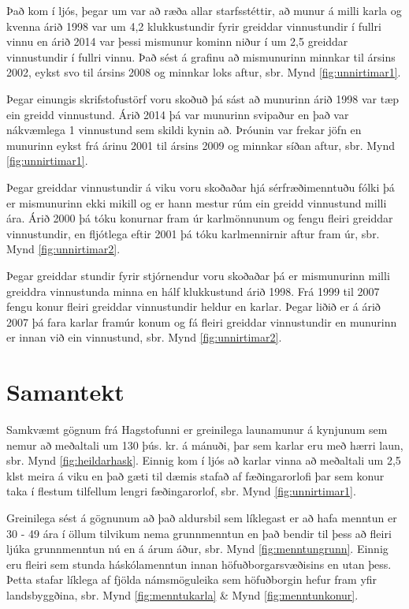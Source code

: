 \documentclass[12pt, git, draft]{rureport}
\begin{document}
Það kom í ljós, þegar um var að ræða allar starfsstéttir, að munur á milli karla og kvenna árið 1998 var um 4,2 klukkustundir fyrir greiddar vinnustundir í fullri vinnu en árið 2014 var þessi mismunur kominn niður í um 2,5 greiddar vinnustundir í fullri vinnu.
Það sést á grafinu að mismunurinn minnkar til ársins 2002, eykst svo til ársins 2008 og minnkar loks aftur, sbr. Mynd \ref{fig:unnirtimar1}.

Þegar einungis skrifstofustörf voru skoðuð þá sást að munurinn árið 1998 var tæp ein greidd vinnustund. Árið 2014 þá var munurinn svipaður en það var nákvæmlega 1 vinnustund sem skildi kynin að.
Þróunin var frekar jöfn en munurinn eykst frá árinu 2001  til ársins 2009 og minnkar síðan aftur, sbr. Mynd \ref{fig:unnirtimar1}.

Þegar greiddar vinnustundir á viku voru skoðaðar hjá sérfræðimenntuðu fólki þá er mismunurinn ekki mikill og er hann mestur rúm ein greidd vinnustund milli ára. Árið 2000 þá tóku konurnar fram úr karlmönnunum og fengu fleiri greiddar vinnustundir, en fljótlega eftir 2001 þá tóku karlmennirnir aftur fram úr, sbr. Mynd \ref{fig:unnirtimar2}.

Þegar greiddar stundir fyrir stjórnendur voru skoðaðar þá er mismunurinn milli greiddra vinnustunda minna en hálf klukkustund árið 1998. Frá 1999 til 2007 fengu konur fleiri greiddar vinnustundir heldur en karlar. Þegar liðið er á árið 2007 þá fara karlar framúr konum og fá fleiri greiddar vinnustundir en munurinn er innan við ein vinnustund, sbr. Mynd \ref{fig:unnirtimar2}. 

\section{Samantekt}

Samkvæmt gögnum frá Hagstofunni\cite{H} er greinilega launamunur á kynjunum sem nemur að meðaltali um 130 þús. kr. á mánuði, þar sem karlar eru með hærri laun, sbr. Mynd \ref{fig:heildarhask}. Einnig kom í ljós að karlar vinna að meðaltali um 2,5 klst meira á viku en það gæti til dæmis stafað af fæðingarorlofi þar sem konur taka í flestum tilfellum lengri fæðingarorlof, sbr. Mynd \ref{fig:unnirtimar1}.

Greinilega sést á gögnunum að það aldursbil sem líklegast er að hafa menntun er 30 - 49 ára í öllum tilvikum nema grunnmenntun en það bendir til þess að fleiri ljúka grunnmenntun nú en á árum áður, sbr. Mynd \ref{fig:menntungrunn}. Einnig eru fleiri sem stunda háskólamenntun innan höfuðborgarsvæðisins en utan þess. Þetta stafar líklega af fjölda námsmöguleika sem höfuðborgin hefur fram yfir landsbyggðina, sbr.  Mynd \ref{fig:menntukarla} \& Mynd \ref{fig:menntunkonur}.
\end{document}
